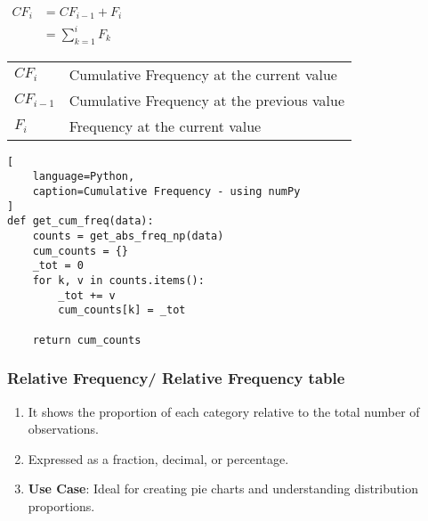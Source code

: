 \begin{table}[H]
    \begin{minipage}[H]{0.3\linewidth}
    $
        \begin{aligned}
            CF_i 
                &= CF_{i-1} + F_{i} \\
                &= \sum_{k=1}^{i} F_{k}
        \end{aligned}
    $
    \end{minipage}
    \begin{minipage}[H]{0.65\linewidth}
        \begin{table}[H]
            \begin{tabular}{l l}
                $CF_i$ & Cumulative Frequency at the current value \\ 
                $CF_{i-1}$ & Cumulative Frequency at the previous value \\ 
                $F_i$ & Frequency at the current value \\ 
            \end{tabular}
        \end{table}
    \end{minipage}
\end{table}

\begin{lstlisting}[
    language=Python, 
    caption=Cumulative Frequency - using numPy
]
def get_cum_freq(data):
    counts = get_abs_freq_np(data)
    cum_counts = {}
    _tot = 0
    for k, v in counts.items():
        _tot += v
        cum_counts[k] = _tot
    
    return cum_counts
\end{lstlisting}


\subsubsection{Relative Frequency/ Relative Frequency table \cite{statistics/book/Statistics-for-Data-Scientists/Maurits-Kaptein}}\label{Data/Describing Data/Frequency or Frequency table/Relative}

\begin{enumerate}
    \item It shows the proportion of each category relative to the total number of observations. \hfill \cite{common/online/chatgpt}

    \item Expressed as a fraction, decimal, or percentage. \hfill \cite{common/online/chatgpt}

    \item \textbf{Use Case}: Ideal for creating pie charts and understanding distribution proportions. \hfill \cite{common/online/chatgpt}
\end{enumerate}



